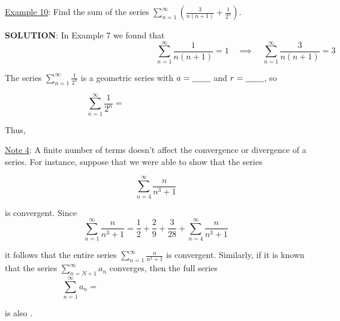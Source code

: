 \documentclass[paper=a4, fontsize=11pt]{scrartcl} %
\numberwithin{equation}{section} %
\numberwithin{figure}{section} %
\numberwithin{table}{section} %
\newcommand{\ds}{\displaystyle}
\begin{document}
  \underline{Example 10}: Find the sum of the series $\ds\sum_{n=1}^\infty\left(\ds\frac{3}{n(n+1)} + \ds\frac{1}{2^n}\right).$\\
  \indent
  
  \textbf{SOLUTION}: In Example 7 we found that
  \vspace{-10pt}
  \[ \hspace{3in}\ds\sum_{n=1}^\infty \ds\frac{1}{n(n+1)} = 1 \quad \implies \quad \ds\sum_{n=1}^\infty \ds\frac{3}{n(n+1)} = 3\]
  
  The series $\ds\sum_{n=1}^\infty \ds\frac{1}{2^n}$ is a geometric series with $a=\underline{\hspace{0.3in}}$ and $r=\underline{\hspace{0.3in}}$, so
  
  \[\ds\sum_{n=1}^\infty \ds\frac{1}{2^n} = \hspace{2in}\]
  \indent
  
  Thus,
  
  \vspace{0.8in}
  
  \underline{Note 4}: A finite number of terms doesn't affect the convergence or divergence of a series. For instance, suppose that we were able to show that the series
  
  \[\ds\sum_{n=4}^\infty \ds\frac{n}{n^3 + 1}\]
  
  is convergent. Since 
  \vspace{-10pt}
  \[\ds\sum_{n=1}^\infty \ds\frac{n}{n^3+1}=\ds\frac{1}{2} + \ds\frac{2}{9} + \ds\frac{3}{28} + \ds\sum_{n=4}^\infty\ds\frac{n}{n^3+1}\]
  
  it follows that the entire series $\ds\sum_{n=1}^\infty \ds\frac{n}{n^3+1}$ is convergent. Similarly, if it is known that the series $\ds\sum_{n=N+1}^\infty a_n$ converges, then the full series
  \vspace{-10pt}
  \[\ds\sum_{n=1}^\infty a_n = \hspace{3in}\]
  
  is also \underline{\hspace{1.25in}}.\\
  \indent

\end{document}
